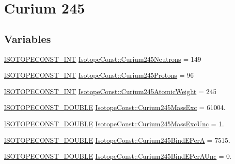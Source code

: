 \hypertarget{group___isotope_const-_curium-_cm245}{}\section{Curium 245}
\label{group___isotope_const-_curium-_cm245}
\subsection*{Variables}
\begin{DoxyCompactItemize}
\item 
\mbox{\hyperlink{group___isotope_const-_macros_ga5f18360b3e99483a35c32d789e62621c}{I\+S\+O\+T\+O\+P\+E\+C\+O\+N\+S\+T\+\_\+\+I\+NT}} \mbox{\hyperlink{group___isotope_const-_curium-_cm245_gaab0a329f23105dcd56ddff486b7193d8}{Isotope\+Const\+::\+Curium245\+Neutrons}} = 149
\item 
\mbox{\hyperlink{group___isotope_const-_macros_ga5f18360b3e99483a35c32d789e62621c}{I\+S\+O\+T\+O\+P\+E\+C\+O\+N\+S\+T\+\_\+\+I\+NT}} \mbox{\hyperlink{group___isotope_const-_curium-_cm245_ga30011cc3835a21a95165c0bff3ac8238}{Isotope\+Const\+::\+Curium245\+Protons}} = 96
\item 
\mbox{\hyperlink{group___isotope_const-_macros_ga5f18360b3e99483a35c32d789e62621c}{I\+S\+O\+T\+O\+P\+E\+C\+O\+N\+S\+T\+\_\+\+I\+NT}} \mbox{\hyperlink{group___isotope_const-_curium-_cm245_gaf6a438d66acd680bed5680cb0aacb6e2}{Isotope\+Const\+::\+Curium245\+Atomic\+Weight}} = 245
\item 
\mbox{\hyperlink{group___isotope_const-_macros_ga8f45a7272ce02c0b4c65c44636ed719a}{I\+S\+O\+T\+O\+P\+E\+C\+O\+N\+S\+T\+\_\+\+D\+O\+U\+B\+LE}} \mbox{\hyperlink{group___isotope_const-_curium-_cm245_ga34baa0ed6d123da61a79613350976623}{Isotope\+Const\+::\+Curium245\+Mass\+Exc}} = 61004.
\item 
\mbox{\hyperlink{group___isotope_const-_macros_ga8f45a7272ce02c0b4c65c44636ed719a}{I\+S\+O\+T\+O\+P\+E\+C\+O\+N\+S\+T\+\_\+\+D\+O\+U\+B\+LE}} \mbox{\hyperlink{group___isotope_const-_curium-_cm245_ga36d25e4f4eaecdd0028544189a53ddf2}{Isotope\+Const\+::\+Curium245\+Mass\+Exc\+Unc}} = 1.
\item 
\mbox{\hyperlink{group___isotope_const-_macros_ga8f45a7272ce02c0b4c65c44636ed719a}{I\+S\+O\+T\+O\+P\+E\+C\+O\+N\+S\+T\+\_\+\+D\+O\+U\+B\+LE}} \mbox{\hyperlink{group___isotope_const-_curium-_cm245_ga7b8e68331dcb2aa6c9d19bb38cec6ba5}{Isotope\+Const\+::\+Curium245\+Bind\+E\+PerA}} = 7515.
\item 
\mbox{\hyperlink{group___isotope_const-_macros_ga8f45a7272ce02c0b4c65c44636ed719a}{I\+S\+O\+T\+O\+P\+E\+C\+O\+N\+S\+T\+\_\+\+D\+O\+U\+B\+LE}} \mbox{\hyperlink{group___isotope_const-_curium-_cm245_gae375209ec7812088aa2abcac05b51350}{Isotope\+Const\+::\+Curium245\+Bind\+E\+Per\+A\+Unc}} = 0.

\end{DoxyCompactItemize}
